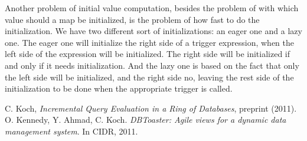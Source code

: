 \documentclass[12pt]{article}
\begin{document}
Another problem of initial value computation, besides the problem of with which value should a map be initialized, is the problem of how fast to do the initialization. We have two different sort of initializations: an eager one and a lazy one. The eager one will initialize the right side of a trigger expression, when the left side of the expression will be initialized. The right side will be initialized if and only if it needs initialization. And the lazy one is based on the fact that only the left side will be initialized, and the right side no, leaving the rest side of the initialization to be done when the appropriate trigger is called.

\begin{thebibliography}{9}
 C. Koch, \emph{Incremental Query Evaluation in a Ring of Databases},  preprint (2011).
 O. Kennedy, Y. Ahmad, C. Koch. \emph{DBToaster: Agile views for a dynamic data management system}. In CIDR, 2011.
\end{thebibliography}
\end{document}
